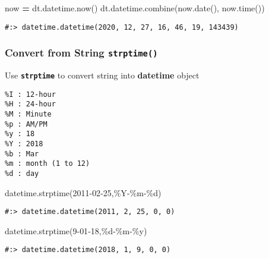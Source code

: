 \documentclass[
]{book}
\newenvironment{Shaded}{\begin{snugshade}}{\end{snugshade}}
\newcommand{\NormalTok}[1]{#1}
\newcommand{\OperatorTok}[1]{\textcolor[rgb]{0.43,0.43,0.43}{\textbf{#1}}}
\newcommand{\SpecialCharTok}[1]{\textcolor[rgb]{0,0,0}{#1}}
\newcommand{\StringTok}[1]{\textcolor[rgb]{0.5,0.5,0.5}{#1}}
\begin{document}
\begin{Shaded}
\begin{Highlighting}[]
\NormalTok{now }\OperatorTok{=}\NormalTok{ dt.datetime.now()}
\NormalTok{dt.datetime.combine(now.date(), now.time())}
\end{Highlighting}
\end{Shaded}

\begin{verbatim}
#:> datetime.datetime(2020, 12, 27, 16, 46, 19, 143439)
\end{verbatim}

\hypertarget{convert-from-string-strptime}{%
\subsubsection{\texorpdfstring{Convert from String \texttt{strptime()}}{Convert from String strptime()}}\label{convert-from-string-strptime}}

Use \textbf{\texttt{strptime}} to convert string into \textbf{datetime} object

\begin{verbatim}
%I : 12-hour
%H : 24-hour
%M : Minute
%p : AM/PM
%y : 18
%Y : 2018
%b : Mar
%m : month (1 to 12)
%d : day
\end{verbatim}

\begin{Shaded}
\begin{Highlighting}[]
\NormalTok{datetime.strptime(}\StringTok{\textquotesingle{}2011{-}02{-}25\textquotesingle{}}\NormalTok{,}\StringTok{\textquotesingle{}\%Y{-}\%m{-}}\SpecialCharTok{\%d}\StringTok{\textquotesingle{}}\NormalTok{)}
\end{Highlighting}
\end{Shaded}

\begin{verbatim}
#:> datetime.datetime(2011, 2, 25, 0, 0)
\end{verbatim}

\begin{Shaded}
\begin{Highlighting}[]
\NormalTok{datetime.strptime(}\StringTok{\textquotesingle{}9{-}01{-}18\textquotesingle{}}\NormalTok{,}\StringTok{\textquotesingle{}}\SpecialCharTok{\%d}\StringTok{{-}\%m{-}\%y\textquotesingle{}}\NormalTok{)}
\end{Highlighting}
\end{Shaded}

\begin{verbatim}
#:> datetime.datetime(2018, 1, 9, 0, 0)
\end{verbatim}
\end{document}
